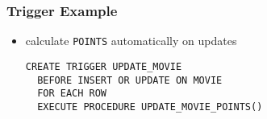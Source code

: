 \documentclass[dvipsnames]{beamer}
\theoremstyle{plain}
\begin{document}
\begin{frame}[fragile]
  \frametitle{Trigger Example}

  \begin{itemize}
    \item calculate \lstinline!POINTS! automatically on updates

    \medskip
    \begin{lstlisting}
CREATE TRIGGER UPDATE_MOVIE
  BEFORE INSERT OR UPDATE ON MOVIE
  FOR EACH ROW
  EXECUTE PROCEDURE UPDATE_MOVIE_POINTS()
    \end{lstlisting}
  \end{itemize}
\end{frame}
%
%
%
%
%
%
%
%
\end{document}
